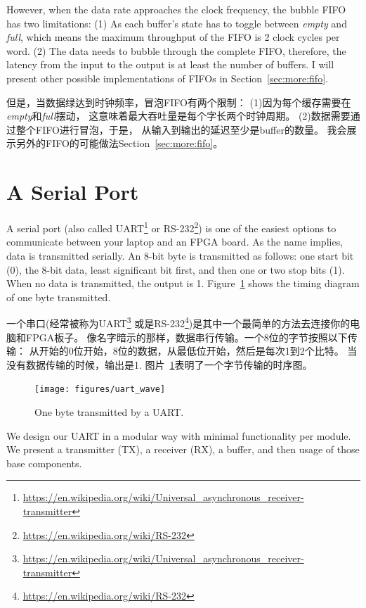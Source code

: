 \documentclass[%
    10pt,
    headinclude, footexclude,
    openright, %
    notitlepage,
    cleardoubleempty,
    headsepline,
    pointlessnumbers,
    bibtotoc, idxtotoc,
    ]{scrbook}
\newcommand{\myref}[2]{\href{#1}{#2}}
\renewcommand{\myref}[2]{{#2}{\footnote{\url{#1}}}}
\begin{document}
However, when the data rate approaches the clock frequency, the bubble FIFO
has two limitations: (1) As each buffer's state has to toggle between \emph{empty} and
\emph{full}, which means the maximum throughput of the FIFO is 2 clock cycles
per word. (2) The data needs to bubble through the complete FIFO, therefore,
the latency from the input to the output is at least the number of buffers.
I will present other possible implementations of FIFOs in Section~\ref{sec:more:fifo}.

但是，当数据绿达到时钟频率，冒泡FIFO有两个限制：
(1)因为每个缓存需要在\emph{empty}和\emph{full}摆动，
这意味着最大吞吐量是每个字长两个时钟周期。
(2)数据需要通过整个FIFO进行冒泡，于是，
从输入到输出的延迟至少是buffer的数量。
我会展示另外的FIFO的可能做法Section~\ref{sec:more:fifo}。

\section{A Serial Port}

A serial port (also called
\myref{https://en.wikipedia.org/wiki/Universal_asynchronous_receiver-transmitter}{UART}
or \myref{https://en.wikipedia.org/wiki/RS-232}{RS-232}) is one of the easiest options
to communicate between your laptop and an FPGA board.
As the name implies, data is transmitted serially. An 8-bit byte is transmitted as follows:
one start bit (0), the 8-bit data, least significant bit first, and then one or two stop
bits (1). When no data is transmitted, the output is 1.
Figure~\ref{fig:uart:wave} shows the timing diagram of one byte transmitted.

一个串口(经常被称为\myref{https://en.wikipedia.org/wiki/Universal_asynchronous_receiver-transmitter}{UART}
或是\myref{https://en.wikipedia.org/wiki/RS-232}{RS-232})是其中一个最简单的方法去连接你的电脑和FPGA板子。
像名字暗示的那样，数据串行传输。一个8位的字节按照以下传输：
从开始的0位开始，8位的数据，从最低位开始，然后是每次1到2个比特。
当没有数据传输的时候，输出是1.
图片~\ref{fig:uart:wave}表明了一个字节传输的时序图。


\begin{figure}
  \centering
  \texttt{[image: figures/uart\_wave]}
  \caption{One byte transmitted by a UART.}
  \label{fig:uart:wave}
\end{figure}

We design our UART in a modular way with minimal functionality
per module. We present a transmitter (TX), a receiver (RX),
a buffer, and then usage of those base components.
\end{document}
